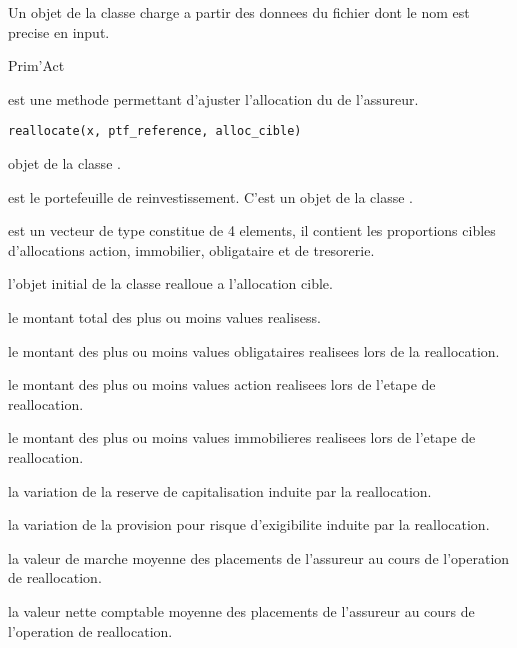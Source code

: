 \documentclass[a4paper]{book}
\begin{document}
%
\begin{Value}
Un objet de la classe  charge a partir des donnees du fichier dont le nom est precise en input.
\end{Value}
%
\begin{Author}\relax
Prim'Act
\end{Author}
%
\begin{Description}\relax
{} est une methode permettant d'ajuster l'allocation du  de l'assureur.
\end{Description}
%
\begin{Usage}
\begin{verbatim}
reallocate(x, ptf_reference, alloc_cible)
\end{verbatim}
\end{Usage}
%
\begin{Arguments}
\begin{ldescription}
\item[\code{x}] objet de la classe .

\item[\code{ptf\_reference}] est le portefeuille de reinvestissement. C'est un objet de la classe .

\item[\code{alloc\_cible}] est un vecteur de type  constitue de 4 elements, il contient les proportions cibles d'allocations
action, immobilier, obligataire et de tresorerie.
\end{ldescription}
\end{Arguments}
%
\begin{Value}
 l'objet initial de la classe  realloue a l'allocation cible.

 le montant total des plus ou moins values realisess.

 le montant des plus ou moins values obligataires realisees lors de la reallocation.

 le montant des plus ou moins values action realisees lors de l'etape de reallocation.

  le montant des plus ou moins values immobilieres realisees lors de l'etape de reallocation.

 la variation de la reserve de capitalisation induite par la reallocation.

 la variation de la provision pour risque d'exigibilite induite par la reallocation.

 la valeur de marche moyenne des placements de l'assureur au cours de l'operation de reallocation.

 la valeur nette comptable moyenne des placements de l'assureur au cours de l'operation de reallocation.
\end{Value}
\end{document}

